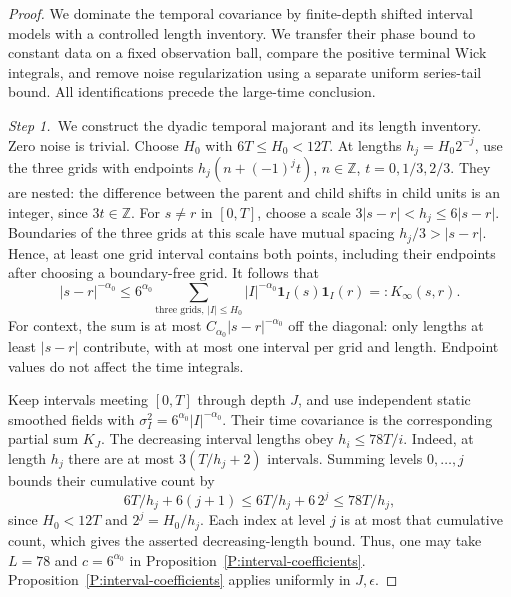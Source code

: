 \documentclass[12pt,oneside,openany]{book}
\numberwithin{equation}{section}
\theoremstyle{nogostyle}
\theoremstyle{definition}
\begin{document}
\begin{proof}
  We dominate the temporal covariance by finite-depth shifted interval models
  with a controlled length inventory. We transfer their phase bound to
  constant data on a fixed observation ball, compare the positive terminal
  Wick integrals, and remove noise regularization using a separate uniform
  series-tail bound. All identifications precede the large-time conclusion.


  \medskip
  \noindent\textit{Step 1.~}We construct the dyadic temporal majorant and its
  length inventory.
  Zero noise is trivial. Choose $H_0$ with $6T \le H_0 < 12T$. At lengths $h_j =
  H_0 2^{-j}$, use the three grids with endpoints $h_j(n+(-1)^j t)$, $n \in
  \mathbb{Z}$, $t = 0,1/3,2/3$. They are nested: the difference between the
  parent and child shifts in child units is an integer, since $3t \in
  \mathbb{Z}$. For $s \ne r$ in $[0,T]$, choose a scale $3|s-r| < h_j \le
  6|s-r|$. Boundaries of the three grids at this scale have mutual spacing
  $h_j/3 > |s-r|$. Hence, at least one grid interval contains both points,
  including their endpoints after choosing a boundary-free grid. It follows that
  \begin{equation}\label{E:dyadic-time-majorant}
    |s-r|^{-\alpha_0}
    \le6^{\alpha_0}\sum_{\text{three grids},\,|I|\le H_0}
    |I|^{-\alpha_0}\mathbf1_I(s)\mathbf1_I(r)=:K_\infty(s,r).
  \end{equation}
  For context, the sum is at most $C_{\alpha_0}|s-r|^{-\alpha_0}$ off the
  diagonal: only lengths at least $|s-r|$ contribute, with at most one interval
  per grid and length. Endpoint values do not affect the time integrals.

  Keep intervals meeting $[0,T]$ through depth $J$, and use independent static
  smoothed fields with $\sigma_I^2 = 6^{\alpha_0}|I|^{-\alpha_0}$. Their time
  covariance is the corresponding partial sum $K_J$. The decreasing interval
  lengths obey $h_i \le 78T/i$. Indeed, at length $h_j$ there are at most
  $3(T/h_j+2)$ intervals. Summing levels $0,\ldots,j$ bounds their cumulative
  count by
  \[
    6T/h_j+6(j+1)\le6T/h_j+6\,2^j\le78T/h_j,
  \]
  since $H_0 < 12T$ and $2^j = H_0/h_j$. Each index at level $j$ is at most that
  cumulative count, which gives the asserted decreasing-length bound. Thus, one
  may take $L = 78$ and $c = 6^{\alpha_0}$ in
  Proposition~\ref{P:interval-coefficients}.
  Proposition~\ref{P:interval-coefficients} applies uniformly in $J,\epsilon$.



\end{proof}
\end{document}

